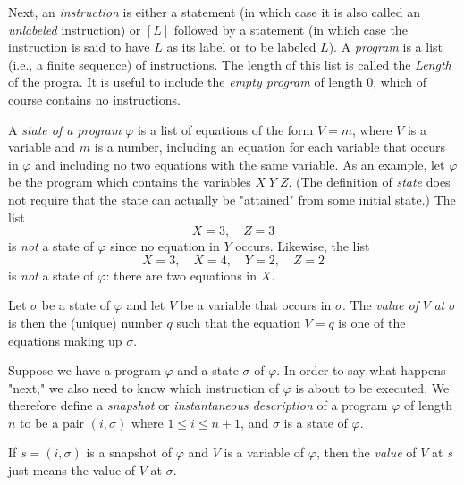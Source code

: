 \documentclass[a4paper,10pt,twoside]{book}
\begin{document}
Next, an \textit{instruction} is either a statement (in which case it is also called an \textit{unlabeled} instruction) or $[L]$ followed by a statement (in which case the instruction is said to have $L$ as its label or to be labeled $L$). A \textit{program} is a list (i.e., a finite sequence) of instructions. The length of this list is called the \textit{Length} of the progra. It is useful to include the \textit{empty program} of length 0, which of course contains no instructions.

A \textit{state of a program} $\varphi$ is a list of equations of the form $V=m$, where $V$ is a variable and $m$ is a number, including an equation for each variable that occurs in $\varphi$ and including no two equations with the same variable. As an example, let $\varphi$ be the program which contains the variables $X\;Y\;Z$. (The definition of \textit{state} does not require that the state can actually be "attained" from some initial state.) The list $$X=3,\quad Z=3$$ is \textit{not} a state of $\varphi$ since no equation in $Y$ occurs. Likewise, the list $$X=3,\quad X=4,\quad Y=2,\quad Z=2$$ is \textit{not} a state of $\varphi$: there are two equations in $X$.

Let $\sigma$ be a state of $\varphi$ and let $V$ be a variable that occurs in $\sigma$. The \textit{value of} $V$ \textit{at} $\sigma$ is then the (unique) number $q$ such that the equation $V=q$ is one of the equations making up $\sigma$.

Suppose we have a program $\varphi$ and a state $\sigma$ of $\varphi$. In order to say what happens "next," we also need to know which instruction of $\varphi$ is about to be executed. We therefore define a \textit{snapshot} or \textit{instantaneous description} of a program $\varphi$ of length $n$ to be a pair $(i,\sigma)$ where $1\le i\le n+1$, and $\sigma$ is a state of $\varphi$.

If $s=(i,\sigma)$ is a snapshot of $\varphi$ and $V$ is a variable of $\varphi$, then the \textit{value} of $V$ at $s$ just means the value of $V$ at $\sigma$.
\end{document}
